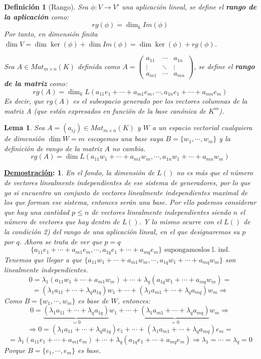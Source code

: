 \documentclass[10pt,a4paper,openright]{book}
\theoremstyle{break}
\newtheorem*{defi}{Definición}
\newtheorem*{lema}{Lema}
\newtheorem*{demo}{\underline{Demostración}:}
\begin{document}
\begin{defi}[Rango]
Sea $\phi: V\rightarrow V'$ una aplicación lineal, se define el \textbf{rango de la aplicación} como:
$$rg(\phi)=\dim_k Im(\phi)$$
Por tanto, en dimensión finita $\dim V=\dim \ker(\phi)+\dim Im(\phi)=\dim \ker(\phi)+ rg(\phi)$.

Sea $A\in Mat_{m\times n}(K)$ definida como $A=\begin{pmatrix} a_{11} & \cdots  & a_{1n}\\ \vdots & \ddots & \vdots \\ a_{m1} & \cdots &a_{mn}\end{pmatrix}$, se define el \textbf{rango de la matriz} como:
$$rg(A)=\dim_k L(a_{11}e_{1}+\cdots+a_{m1}e_m, \cdots , a_{1n}e_1+\cdots+a_{mn}e_m)$$
Es decir, que $rg(A)$ es el subespacio generado por los vectores columnas de la matriz A (que están expresados en función de la base canónica de $K^m$).
\end{defi}

\begin{lema}
Sea $A=(a_{ij})\in Mat_{m\times n}(K)$ y $W$ a un espacio vectorial cualquiera de dimensión $\dim W=m$ escogemos una base suya $B=\{w_1, \cdots, w_m\}$ y la definición de rango de la matriz $A$ no cambia.
$$rg(A)=\dim L(a_{11}w_{1}+\cdots+a_{m1}w_m, \cdots, a_{1n}w_1+\cdots+a_{mn}w_m)$$
\end{lema}
\begin{demo}
En el fondo, la dimensión de $L()$ no es más que el número de vectores linealmente independientes de ese sistema de generadores, por lo que yo si encuentro un conjunto de vectores linealmente independientes maximal de los que forman ese sistema, entonces serán una base. Por ello podemos considerar que hay una cantidad $p\leq n$ de vectores linealmente independientes siendo $n$ el número de vectores que hay dentro de $L()$.  Y lo mismo ocurre con el $L()$ de la condición 2) del rango de una aplicación lineal, en el que designaremos su $p$ por $q$. Ahora se trata de ver que $p=q$
$$\{a_{11}e_{1}+\cdots+a_{m1}e_m, \cdots, a_{1q}e_1+\cdots+a_{mq}e_m\}\mbox{ supongamoslos l. ind.}$$
Tenemos que llegar a que $\{a_{11}w_1+\cdots+a_{m1}w_m,\cdots,a_{1q}w_1+\cdots+a_{mq}w_m\}$ son linealmente independientes.
$$0=\lambda_1(a_{11}w_1+\cdots+a_{m1}w_m)+\cdots+\lambda_q(a_{1q}w_1+\cdots+a_{mq}w_m)=$$
$$=(\lambda_1a_{11}+\cdots+\lambda_qa_{1q})w_1+\cdots+(\lambda_1a_{m1}+\cdots+\lambda_qa_{mq})w_m\Rightarrow $$
Como $B=\{w_1, \cdots, w_m\}$ es base de $W$, entonces:
$$0=\underbrace{(\lambda_1a_{11}+\cdots+\lambda_qa_{1q})}_{=0}w_1+\cdots+\underbrace{(\lambda_1a_{m1}+\cdots+\lambda_qa_{mq})}_{=0}w_m\Rightarrow$$
$$\Rightarrow  0=(\lambda_1a_{11}+\cdots+\lambda_qa_{1q})e_1+\cdots+(\lambda_1a_{m1}+\cdots+\lambda_qa_{mq})e_m=$$
$$=\lambda_1(a_{11}e_1+\cdots+a_{m1}e_m)+\cdots+\lambda_q(a_{1q}e_1+\cdots+a_{mq}e_m)\Rightarrow \lambda_1=\cdots=\lambda_q=0$$
Porque $B=\{e_1, \cdots, e_m \}$ es base.
\end{demo}
\end{document}

